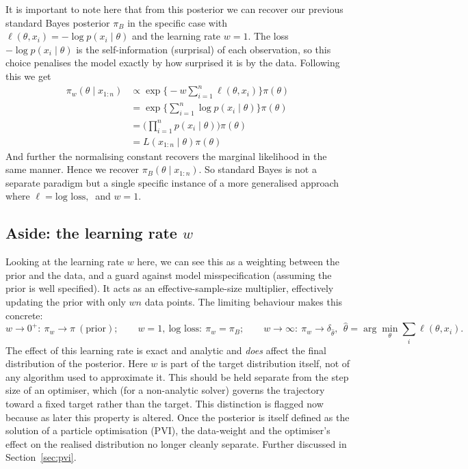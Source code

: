 \documentclass[11pt,a4paper]{article}
\newcommand{\add}[1]{{\color{red}#1}}
\begin{document}
It is important to note here that from this posterior we can recover our previous standard Bayes posterior $\pi_{B}$ in the specific case with $\ell(\theta, x_i) = -\log p(x_i \mid \theta)$ and the learning rate $w = 1$. \add{The loss $-\log p(x_i\mid\theta)$ is the self-information (surprisal) of each observation, so this choice penalises the model exactly by how surprised it is by the data.} Following this we get
\begin{align*}
    \pi_w(\theta \mid x_{1:n}) & \propto \exp\Big\{-w\sum_{i=1}^{n}\ell(\theta, x_i)\Big\}\pi(\theta) \\
                               & = \exp\Big\{\sum_{i=1}^{n}\log p(x_i \mid \theta)\Big\}\pi(\theta)   \\
                               & = \Big(\prod_{i=1}^{n} p(x_i \mid \theta)\Big)\pi(\theta)            \\
                               & = L(x_{1:n}\mid\theta)\pi(\theta)
\end{align*}
And further the normalising constant recovers the marginal likelihood in the same manner. Hence we recover $\pi_B(\theta \mid x_{1:n})$. \add{So standard Bayes is not a separate paradigm but a single specific instance of a more generalised approach where $\ell = \text{log loss},\ $ and $w = 1$}.

\subsection*{\add{Aside: the learning rate $w$}}
Looking at the learning rate $w$ here, we can see this as a weighting between the prior and the data, and a guard against model misspecification (assuming the prior is well specified). It acts as an effective-sample-size multiplier, effectively updating the prior with only $wn$ data points. \add{The limiting behaviour makes this concrete:
    $$
        w \to 0^+ : \ \pi_w \to \pi \ (\text{prior}); \qquad
        w = 1,\ \text{log loss} : \ \pi_w = \pi_B; \qquad
        w \to \infty : \ \pi_w \to \delta_{\hat{\theta}},\ \ \hat{\theta} = \arg\min_{\theta}\textstyle\sum_i \ell(\theta, x_i).
    $$}
The effect of this learning rate is exact and analytic and \emph{does} affect the final distribution of the posterior. \add{Here $w$ is part of the target distribution itself, not of any algorithm used to approximate it}. This should be held separate from the step size of an optimiser, which (for a non-analytic solver) governs the trajectory toward a fixed target rather than the target. \add{This distinction is flagged now because as later this property is altered. Once the posterior is itself defined as the solution of a particle optimisation (PVI), the data-weight and the optimiser's effect on the realised distribution no longer cleanly separate. Further discussed in Section~\ref{sec:pvi}.}
\end{document}
